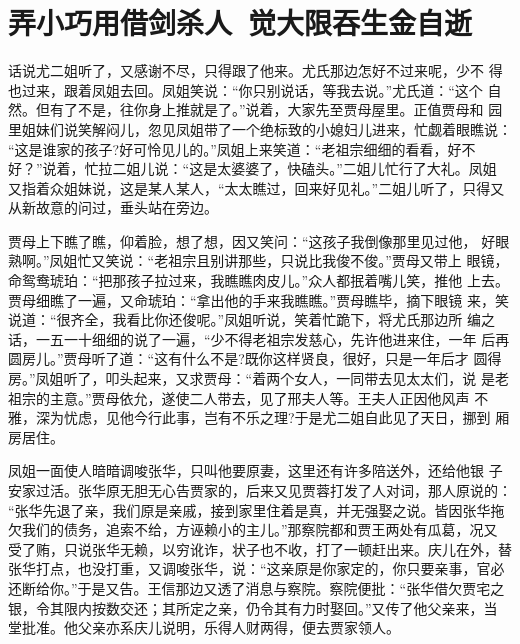 \chapter{弄小巧用借剑杀人~觉大限吞生金自逝}

话说尤二姐听了，又感谢不尽，只得跟了他来。尤氏那边怎好不过来呢，少不
得也过来，跟着凤姐去回。凤姐笑说：“你只别说话，等我去说。”尤氏道：“这个
自然。但有了不是，往你身上推就是了。”说着，大家先至贾母屋里。正值贾母和
园里姐妹们说笑解闷儿，忽见凤姐带了一个绝标致的小媳妇儿进来，忙觑着眼瞧说：
“这是谁家的孩子?好可怜见儿的。”凤姐上来笑道：“老祖宗细细的看看，好不
好？”说着，忙拉二姐儿说：“这是太婆婆了，快磕头。”二姐儿忙行了大礼。凤姐
又指着众姐妹说，这是某人某人，“太太瞧过，回来好见礼。”二姐儿听了，只得又
从新故意的问过，垂头站在旁边。

贾母上下瞧了瞧，仰着脸，想了想，因又笑问：“这孩子我倒像那里见过他，
好眼熟啊。”凤姐忙又笑说：“老祖宗且别讲那些，只说比我俊不俊。”贾母又带上
眼镜，命鸳鸯琥珀：“把那孩子拉过来，我瞧瞧肉皮儿。”众人都抿着嘴儿笑，推他
上去。贾母细瞧了一遍，又命琥珀：“拿出他的手来我瞧瞧。”贾母瞧毕，摘下眼镜
来，笑说道：“很齐全，我看比你还俊呢。”凤姐听说，笑着忙跪下，将尤氏那边所
编之话，一五一十细细的说了一遍，“少不得老祖宗发慈心，先许他进来住，一年
后再圆房儿。”贾母听了道：“这有什么不是?既你这样贤良，很好，只是一年后才
圆得房。”凤姐听了，叩头起来，又求贾母：“着两个女人，一同带去见太太们，说
是老祖宗的主意。”贾母依允，遂使二人带去，见了邢夫人等。王夫人正因他风声
不雅，深为忧虑，见他今行此事，岂有不乐之理?于是尤二姐自此见了天日，挪到
厢房居住。

凤姐一面使人暗暗调唆张华，只叫他要原妻，这里还有许多陪送外，还给他银
子安家过活。张华原无胆无心告贾家的，后来又见贾蓉打发了人对词，那人原说的：
“张华先退了亲，我们原是亲戚，接到家里住着是真，并无强娶之说。皆因张华拖
欠我们的债务，追索不给，方诬赖小的主儿。”那察院都和贾王两处有瓜葛，况又
受了贿，只说张华无赖，以穷讹诈，状子也不收，打了一顿赶出来。庆儿在外，替
张华打点，也没打重，又调唆张华，说：“这亲原是你家定的，你只要亲事，官必
还断给你。”于是又告。王信那边又透了消息与察院。察院便批：“张华借欠贾宅之
银，令其限内按数交还；其所定之亲，仍令其有力时娶回。”又传了他父亲来，当
堂批准。他父亲亦系庆儿说明，乐得人财两得，便去贾家领人。

